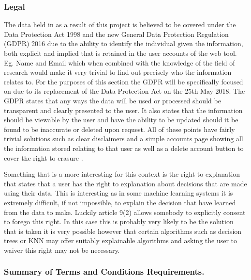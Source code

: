 \documentclass{ecmm427_assignment}
\begin{document}
\subsubsection{Legal }

The data held in as a result of this project is believed to be covered
under the Data Protection Act 1998 and the new General Data Protection
Regulation (GDPR) 2016 due to the ability to identify the individual
given the information, both explicit and implied that is retained in
the user accounts of the web tool. Eg. Name and Email which when combined
with the knowledge of the field of research would make it very trivial
to find out precisely who the information relates to. For the purposes
of this section the GDPR will be specifically focused on due to its
replacement of the Data Protection Act on the 25th May 2018. The GDPR
states that any ways the data will be used or processed should be
transparent and clearly presented to the user. It also states that
the information should be viewable by the user and have the ability
to be updated should it be found to be inaccurate or deleted upon
request. All of these points have fairly trivial solutions such as
clear disclaimers and a simple accounts page showing all the information
stored relating to that user as well as a delete account button to
cover the right to erasure \cite{eu:gdpr}. 

Something that is a more interesting for this context is the right
to explanation that states that a user has the right to explanation
about decisions that are made using their data. This is interesting
as in some machine learning systems it is extremely difficult, if
not impossible, to explain the decision that have learned from the
data to make. Luckily article 9(2) allows somebody to explicitly consent
to forego this right. In this case this is probably very likely to
be the solution that is taken it is very possible however that certain
algorithms such as decision trees or KNN may offer suitably explainable
algorithms and asking the user to waiver this right may not be necessary. 

\subsubsection{Summary of Terms and Conditions Requirements.}
\end{document}
